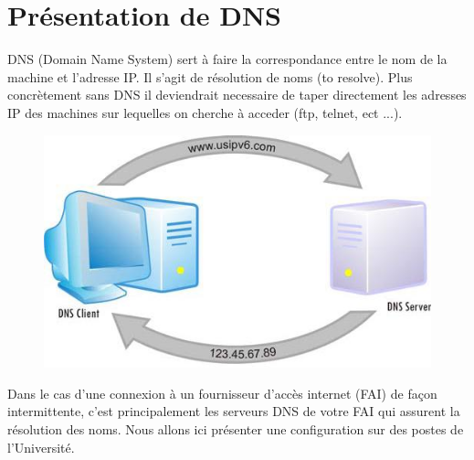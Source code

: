 \chapter{Présentation de DNS}
DNS (Domain Name System) sert à faire la correspondance entre le nom de la machine et l'adresse IP. Il s'agit de résolution de noms (to resolve). Plus concrètement sans DNS il deviendrait necessaire de taper directement les adresses IP des machines sur lequelles on cherche à acceder (ftp, telnet, ect ...).
\begin{figure}[!h]
\begin{center}
  \includegraphics[scale=0.50]{d.jpg}
\end{center}
\end{figure}  Dans le cas d'une connexion à un fournisseur d'accès internet (FAI) de façon intermittente, c'est principalement les serveurs DNS de votre FAI qui assurent la résolution des noms.
Nous allons ici présenter une configuration sur des postes de l'Université.


